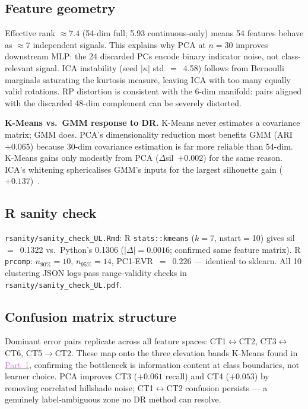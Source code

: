 \documentclass[conference]{IEEEtran}
\newcommand{\partref}[2]{\hyperref[#2]{\textcolor{orchid}{Part~#1}}}
\begin{document}
{\subsection{Feature geometry}\label{sec:disc:efrank}

Effective rank $\approx 7.4$ (54-dim full; 5.93 continuous-only) means 54
features behave as $\approx7$ independent signals.
This explains why PCA at $n{=}30$ improves downstream MLP: the 24 discarded
PCs encode binary indicator noise, not class-relevant signal.
ICA instability (seed $|\kappa|$ std~$=$~4.58) follows from Bernoulli
marginals saturating the kurtosis measure, leaving ICA with too many
equally valid rotations.
RP distortion is consistent with the 6-dim manifold: pairs aligned with the
discarded 48-dim complement can be severely distorted.

\textbf{K-Means vs.\ GMM response to DR.}
K-Means never estimates a covariance matrix; GMM does.
PCA's dimensionality reduction most benefits GMM (ARI $+0.065$) because
30-dim covariance estimation is far more reliable than 54-dim.
K-Means gains only modestly from PCA ($\Delta$sil~$+0.002$) for the same reason.
ICA's whitening sphericalises GMM's inputs for the largest silhouette
gain ($+0.137$)~\cite{kleinberg2002impossibility}.

\subsection{R sanity check}\label{sec:disc:rsanity}

\texttt{rsanity/sanity\_check\_UL.Rmd}: R \texttt{stats::kmeans} ($k{=}7$,
nstart$=$10) gives sil~$=$~0.1322 vs.\ Python's 0.1306
($|\Delta|{=}0.0016$; confirmed same feature matrix).
R \texttt{prcomp}: $n_{90\%}{=}10$, $n_{95\%}{=}14$, PC1-EVR~$=$~0.226 ---
identical to sklearn. All 10 clustering JSON logs pass range-validity
checks in \texttt{rsanity/sanity\_check\_UL.pdf}.

\subsection{Confusion matrix structure}\label{sec:disc:cm}

Dominant error pairs replicate across all feature spaces:
CT1$\leftrightarrow$CT2, CT3$\leftrightarrow$CT6, CT5$\to$CT2.
These map onto the three elevation bands K-Means found in \partref{1}{sec:p1},
confirming the bottleneck is information content at class boundaries, not
learner choice.
PCA improves CT3 ($+0.061$ recall) and CT4 ($+0.053$) by removing
correlated hillshade noise; CT1$\leftrightarrow$CT2 confusion persists ---
a genuinely label-ambiguous zone no DR method can resolve.

}
\end{document}
